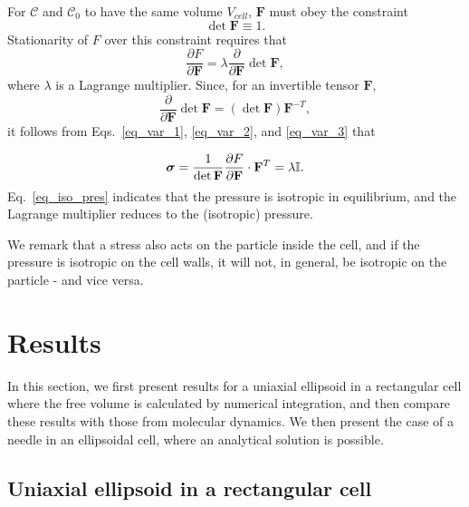 \documentclass{article}
\begin{document}
For $\mathcal{C}$ and $\mathcal{C}_0$ to have the same volume $V_{cell}$, $%
\mathbf{F}$ must obey the constraint 
\begin{equation}
\det\mathbf{F}\equiv 1.
\end{equation}
Stationarity of $F$ over this constraint requires that 
\begin{equation}
\frac{\partial F}{\partial \mathbf{F}} = \lambda \frac{\partial}{\partial 
\mathbf{F}}\det\mathbf{F},  \label{eq_var_2}
\end{equation}
where $\lambda$ is a Lagrange multiplier. Since, for an invertible tensor $%
\mathbf{F}$, 
\begin{equation}
\frac{\partial}{\partial \mathbf{F}}\det{\mathbf{F}}=(\det\mathbf{F}) 
\mathbf{F}^{-T},  \label{eq_var_3}
\end{equation}
it follows from Eqs.~\eqref{eq_var_1}, \eqref{eq_var_2}, and \eqref{eq_var_3}
that


\begin{equation}
\boldsymbol{\sigma }=\frac{1}{\det {\mathbf{F}}}\frac{\partial F}{\partial {%
\mathbf{F}}}\cdot {\mathbf{F}}^{T}=\lambda \mathbb{I}.  \label{eq_iso_pres}
\end{equation}%
Eq.~\eqref{eq_iso_pres} indicates that the pressure is isotropic in
equilibrium, and the Lagrange multiplier reduces to the (isotropic) pressure.

We remark that a stress also acts on the particle inside the cell, and if
the pressure is isotropic on the cell walls, it will not, in general, be
isotropic on the particle - and vice versa.



\section{Results}

\label{Sec_ellip_Rec}

In this section, we first present results for a uniaxial ellipsoid in a
rectangular cell where the free volume is calculated by numerical
integration, and then compare these results with those from molecular
dynamics. We then present the case of a needle in an ellipsoidal cell, where
an analytical solution is possible.

\subsection{ Uniaxial ellipsoid in a rectangular cell}
\end{document}
